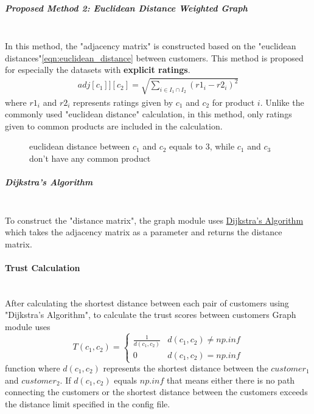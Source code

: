 	\subparagraph{Proposed Method 2: Euclidean Distance Weighted Graph}\mbox{}\\
	\label{prop_method_2}
	In this method, the "adjacency matrix" is constructed based on the "euclidean distances"\ref{eqn:euclidean_distance} between customers. This method is proposed for especially the datasets with \textbf{explicit ratings}.
	\begin{equation} 
	\label{eqn:euclidean_distance}
	\begin{split}
	adj[c_{1}]][c_{2}] = \sqrt{\sum_{i\in I_{1}\cap I_{2}}^{} (r1_{i}-r2_{i})^2}
	\end{split}
	\end{equation}
	where $r1_{i}$ and $r2_{i}$ represents ratings given by $c_{1}$ and $c_{2}$ for product $i$. Unlike the commonly used "euclidean distance" calculation, in this method, only ratings given to common products are included in the calculation.
	\begin{figure}[H]
		\centering
		\caption{euclidean distance between $c_{1}$ and $c_{2}$ equals to 3, while $c_{1}$ and $c_{3}$ don't have any common product}
	\end{figure}
	
	\subparagraph{Dijkstra's Algorithm}\mbox{}\\
	To construct the "distance matrix", the graph module uses \href{https://en.wikipedia.org/wiki/Dijkstra%27s_algorithm}{Dijkstra's Algorithm} which takes the adjacency matrix as a parameter and returns the distance matrix.
	
	\paragraph{Trust Calculation}\mbox{}\\
	After calculating the shortest distance between each pair of customers using "Dijkstra's Algorithm", to calculate the trust scores between customers Graph module uses
	\begin{equation*} 
	T(c_{1}, c_{2})= \left\{
	\begin{array}{lr} 
	\frac{1}{d(c_{1}, c_{2})} & d(c_{1}, c_{2}) \neq np.inf \\
	0 & d(c_{1}, c_{2}) = np.inf
	\end{array}
	\right.
	\end{equation*}
	function where $d(c_{1}, c_{2})$ represents the shortest distance between the $customer_{1}$ and $customer_{2}$. If $d(c_{1}, c_{2})$ equals $np.inf$ that means either there is no path connecting the customers or the shortest distance between the customers exceeds the distance limit specified in the config file. \\
	
